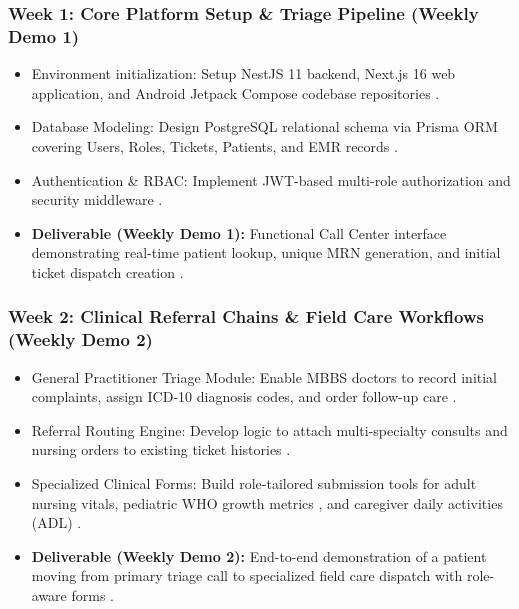 \documentclass[lettersize,onecolumn,journal]{IEEEtran}
\begin{document}
	\subsubsection{Week 1: Core Platform Setup \& Triage Pipeline (Weekly Demo 1)}
	\begin{itemize}
		\item Environment initialization: Setup NestJS 11 backend, Next.js 16 web application, and Android Jetpack Compose codebase repositories \cite{nestjs_framework, nextjs_app_router}.
		\item Database Modeling: Design PostgreSQL relational schema via Prisma ORM covering Users, Roles, Tickets, Patients, and EMR records \cite{srs2026}.
		\item Authentication \& RBAC: Implement JWT-based multi-role authorization and security middleware \cite{rbac_standard}.
		\item \textbf{Deliverable (Weekly Demo 1):} Functional Call Center interface demonstrating real-time patient lookup, unique MRN generation, and initial ticket dispatch creation \cite{srs2026}.
	\end{itemize}
	
	\subsubsection{Week 2: Clinical Referral Chains \& Field Care Workflows (Weekly Demo 2)}
	\begin{itemize}
		\item General Practitioner Triage Module: Enable MBBS doctors to record initial complaints, assign ICD-10 diagnosis codes, and order follow-up care \cite{who2016icd10}.
		\item Referral Routing Engine: Develop logic to attach multi-specialty consults and nursing orders to existing ticket histories \cite{srs2026}.
		\item Specialized Clinical Forms: Build role-tailored submission tools for adult nursing vitals, pediatric WHO growth metrics \cite{who_child_growth}, and caregiver daily activities (ADL) \cite{srs2026}.
		\item \textbf{Deliverable (Weekly Demo 2):} End-to-end demonstration of a patient moving from primary triage call to specialized field care dispatch with role-aware forms \cite{srs2026}.
	\end{itemize}
	
\end{document}

